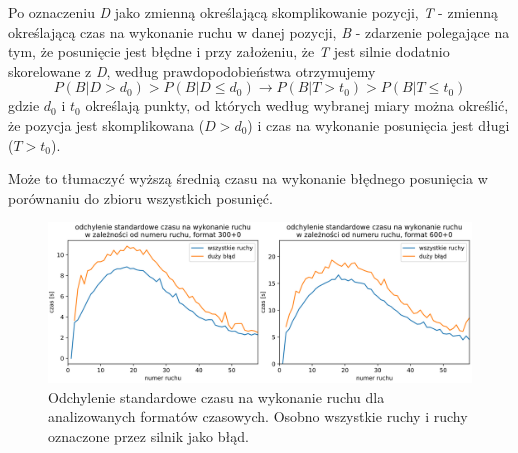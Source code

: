 \documentclass[inzynierska]{pwr_wmat_praca_dyplomowa}
\theoremstyle{plain}
\numberwithin{theorem}{chapter}
\theoremstyle{definition}
\numberwithin{theorem}{chapter}
\begin{document}
Po oznaczeniu \textit{D} jako zmienną określającą skomplikowanie pozycji, \textit{T} - zmienną określającą czas na wykonanie ruchu w danej pozycji, \textit{B} - zdarzenie polegające na tym, że posunięcie jest błędne i przy założeniu, że \textit{T} jest silnie dodatnio skorelowane z \textit{D}, według prawdopodobieństwa otrzymujemy %
\begin{equation}
	P(B|D>d_0) > P(B|D\leq d_0) \rightarrow P(B|T>t_0) > P(B|T\leq t_0)
\end{equation}
gdzie $d_0$ i $t_0$ określają punkty, od których według wybranej miary można określić, że pozycja jest skomplikowana ($D>d_0$) i czas na wykonanie posunięcia jest długi ($T>t_0$).


Może to tłumaczyć wyższą średnią czasu na wykonanie błędnego posunięcia w porównaniu do zbioru wszystkich posunięć.
\begin{figure}[H]
	\centering
	\includegraphics[width=\textwidth]{std_czas_na_ruch.png}
	\caption{Odchylenie standardowe czasu na wykonanie ruchu dla analizowanych formatów czasowych. Osobno wszystkie ruchy i ruchy oznaczone przez silnik jako błąd.}
	\label{rys:std_czas_na_ruch}
\end{figure}
\end{document}
